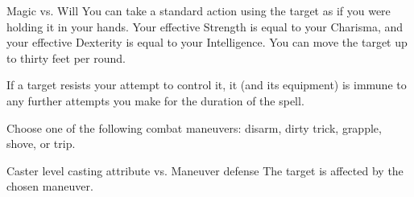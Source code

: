 \begin{spellheader}
\end{spellheader}
\begin{spellcontent}
    \begin{spelltargetinginfo}
    \end{spelltargetinginfo}
    \begin{spelleffects}
        \begin{spellattack}{Magic vs. Will}
            \spellsuccess You can take a standard action using the target as if you were holding it in your hands. Your effective Strength is equal to your Charisma, and your effective Dexterity is equal to your Intelligence. You can move the target up to thirty feet per round.
        \end{spellattack}
    \end{spelleffects}
\end{spellcontent}
\begin{spellfooter}
    \spellnotes If a target resists your attempt to control it, it (and its equipment) is immune to any further attempts you make for the duration of the spell.
\end{spellfooter}

\begin{spellheader}
\end{spellheader}
\begin{spellcontent}
    \begin{spelltargetinginfo}
    \end{spelltargetinginfo}
    \begin{spelleffects}
        \spellspecial Choose one of the following combat maneuvers: disarm, dirty trick, grapple, shove, or trip.
        \begin{spellattack}{Caster level \add casting attribute vs. Maneuver defense}
            \spellsuccess The target is affected by the chosen maneuver.
        \end{spellattack}
    \end{spelleffects}
\end{spellcontent}
\begin{spellfooter}

\end{spellfooter}

